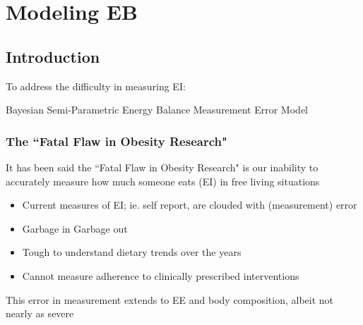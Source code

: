 \documentclass[handout]{beamer}\usepackage[]{graphicx}\usepackage[]{color}
\begin{document}
\section{Modeling EB}
\subsection{Introduction}
\begin{frame}
To address the difficulty in measuring EI:

\vspace{0.4cm}
\huge Bayesian Semi-Parametric Energy Balance Measurement Error Model

\end{frame}


\begin{frame}
\frametitle{The ``Fatal Flaw in Obesity Research"}
It has been said the ``Fatal Flaw in Obesity Research" is our inability to accurately measure how much someone eats (EI) in free living situations

\begin{itemize}
\item
Current measures of EI; ie. self report, are clouded with (measurement) error \\
\item
Garbage in Garbage out \\
\item
Tough to understand dietary trends over the years \\
\item
Cannot measure adherence to clinically prescribed interventions \\
\end{itemize}

This error in measurement extends to EE and body composition, albeit not nearly as severe

\end{frame}

\end{document}
